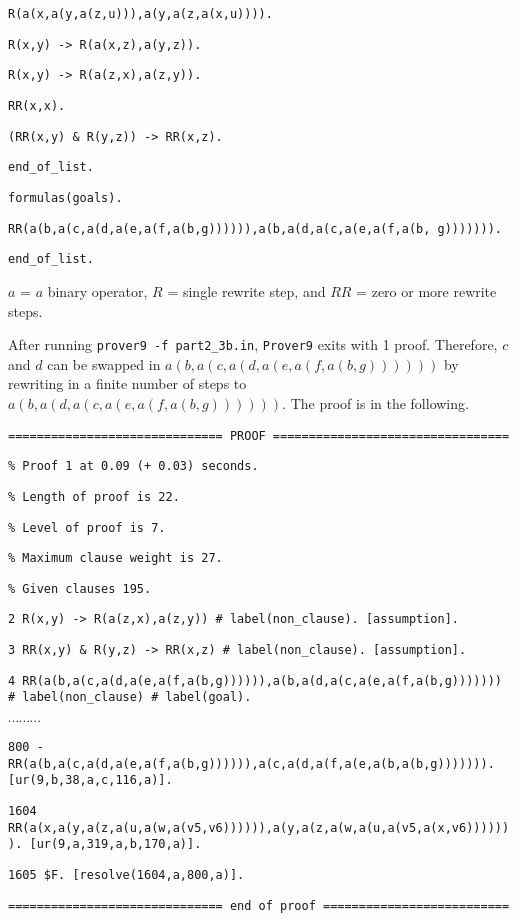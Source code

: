 \begin{description}
{{\tt R(a(x,a(y,a(z,u))),a(y,a(z,a(x,u)))).}

{\tt R(x,y) -> R(a(x,z),a(y,z)).}

{\tt R(x,y) -> R(a(z,x),a(z,y)).}

{\tt RR(x,x). }

{\tt (RR(x,y) \& R(y,z)) -> RR(x,z). }

{\tt end\_of\_list.}

{\tt formulas(goals).}

{\tt RR(a(b,a(c,a(d,a(e,a(f,a(b,g)))))),a(b,a(d,a(c,a(e,a(f,a(b, g))))))).}

{\tt end\_of\_list.  }

}

\vspace{3mm}

$a$ = $a$ binary operator, $R$ = single rewrite step, and $RR$ = zero or more rewrite steps.

  After running {\tt prover9 -f  part2\_3b.in}, {\tt Prover9} exits with 1 proof. Therefore, $c$ and $d$ can be swapped in $a(b, a(c, a(d, a(e, a(f, a(b, g))))))$ by rewriting in a finite number of steps to $a(b, a(d, a(c, a(e, a(f, a(b, g))))))$. The proof is in the following.
 
\vspace{3mm} 

{\footnotesize

{\tt ============================== PROOF =================================}

{\tt \% Proof 1 at 0.09 (+ 0.03) seconds.}

{\tt \% Length of proof is 22.}

{\tt \% Level of proof is 7.}

{\tt \% Maximum clause weight is 27.}

{\tt \% Given clauses 195.}

{\tt 2 R(x,y) -> R(a(z,x),a(z,y)) \# label(non\_clause).  [assumption].}

{\tt 3 RR(x,y) \& R(y,z) -> RR(x,z) \# label(non\_clause).  [assumption].}

{\tt 4 RR(a(b,a(c,a(d,a(e,a(f,a(b,g)))))),a(b,a(d,a(c,a(e,a(f,a(b,g))))))) \#
label(non\_clause) \# label(goal).}

$\cdots \cdots \cdots$

{\tt 800 -RR(a(b,a(c,a(d,a(e,a(f,a(b,g)))))),a(c,a(d,a(f,a(e,a(b,a(b,g))))))).  [ur(9,b,38,a,c,116,a)].}

{\tt 1604 RR(a(x,a(y,a(z,a(u,a(w,a(v5,v6)))))),a(y,a(z,a(w,a(u,a(v5,a(x,v6))))))).  [ur(9,a,319,a,b,170,a)].}

{\tt 1605 \$F.  [resolve(1604,a,800,a)].}

{\tt ============================== end of proof ==========================}

}

\vspace{3mm} 

\end{description}

